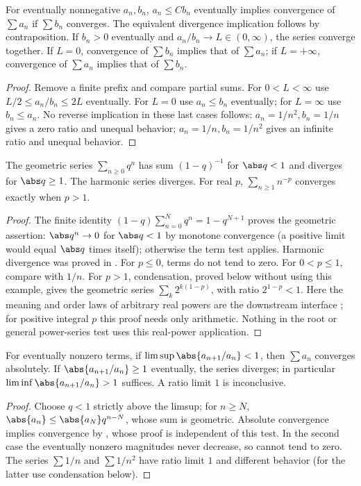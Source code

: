 \begin{theorem}
For eventually nonnegative $a_n,b_n$, $a_n\leq Cb_n$ eventually implies convergence of $\sum a_n$ if $\sum b_n$ converges. The equivalent divergence implication follows by contraposition. If $b_n>0$ eventually and $a_n/b_n\to L\in(0,\infty)$, the series converge together. If $L=0$, convergence of $\sum b_n$ implies that of $\sum a_n$; if $L=+\infty$, convergence of $\sum a_n$ implies that of $\sum b_n$.
\end{theorem}
\begin{proof}
Remove a finite prefix and compare partial sums. For $0<L<\infty$ use $L/2\leq a_n/b_n\leq2L$ eventually. For $L=0$ use $a_n\leq b_n$ eventually; for $L=\infty$ use $b_n\leq a_n$. No reverse implication in these last cases follows: $a_n=1/n^2,b_n=1/n$ gives a zero ratio and unequal behavior; $a_n=1/n,b_n=1/n^2$ gives an infinite ratio and unequal behavior.
\end{proof}

\begin{example}
The geometric series $\sum_{n\geq0}q^n$ has sum $(1-q)^{-1}$ for $\abs q<1$ and diverges for $\abs q\geq1$. The harmonic series diverges. For real $p$, $\sum_{n\geq1}n^{-p}$ converges exactly when $p>1$.
\end{example}
\begin{proof}
The finite identity $(1-q)\sum_{n=0}^Nq^n=1-q^{N+1}$ proves the geometric assertion: $\abs q^n\to0$ for $\abs q<1$ by monotone convergence (a positive limit would equal $\abs q$ times itself); otherwise the term test applies. Harmonic divergence was proved in . For $p\leq0$, terms do not tend to zero. For $0<p\leq1$, compare with $1/n$. For $p>1$, condensation, proved below without using this example, gives the geometric series $\sum_k2^{k(1-p)}$, with ratio $2^{1-p}<1$. Here the meaning and order laws of arbitrary real powers are the downstream interface ; for positive integral $p$ this proof needs only arithmetic. Nothing in the root or general power-series test uses this real-power application.
\end{proof}

\begin{theorem}
For eventually nonzero terms, if $\limsup\abs{a_{n+1}/a_n}<1$, then $\sum a_n$ converges absolutely. If $\abs{a_{n+1}/a_n}\geq1$ eventually, the series diverges; in particular $\liminf\abs{a_{n+1}/a_n}>1$ suffices. A ratio limit $1$ is inconclusive.
\end{theorem}
\begin{proof}
Choose $q<1$ strictly above the limsup; for $n\geq N$, $\abs{a_n}\leq\abs{a_N}q^{n-N}$, whose sum is geometric. Absolute convergence implies convergence by , whose proof is independent of this test. In the second case the eventually nonzero magnitudes never decrease, so cannot tend to zero. The series $\sum1/n$ and $\sum1/n^2$ have ratio limit $1$ and different behavior (for the latter use condensation below).
\end{proof}

